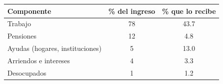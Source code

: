 
\begin{tabular}[t]{lcc}
\toprule
Componente & \% del ingreso & \% que lo recibe\\
\midrule
Trabajo & 78 & 43.7\\
Pensiones & 12 & 4.8\\
Ayudas (hogares, instituciones) & 5 & 13.0\\
Arriendos e intereses & 4 & 3.3\\
Desocupados & 1 & 1.2\\
\bottomrule
\end{tabular}
